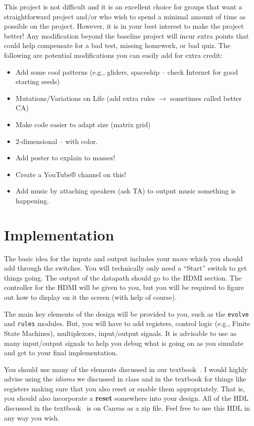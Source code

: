 \documentclass{article}
\begin{document}
This project is not difficult and it is an excellent choice for groups that want a straightforward
project and/or who wish to spend a minimal amount of time as possible on the project. However,
it is in your best interest to make the project better! Any modification beyond the baseline
project will incur extra points that could help compensate for a bad test, missing homework, or
bad quiz. The following are potential modifications you can easily add
for extra credit:
\begin{itemize}
\item Add some cool patterns (e.g., gliders, spaceship – check Internet for good starting seeds)
\item Mutations/Variations on Life (add extra rules $\rightarrow$ sometimes called better CA)
\item Make code easier to adapt size (matrix grid)
\item $2$-dimensional – with color.
\item Add poster to explain to masses!
\item Create a YouTube® channel on this!
\item Add music by attaching speakers (ask TA) to output music something is
  happening.
\end{itemize}

\section{Implementation}

The basic idea for the inputs and output includes your move which you
should add through the switches.  You will technically only need a
``Start'' switch to get things going.  The output of the datapath
should go to the HDMI section.  The controller for the HDMI will be
given to you, but you will be required to figure out how to display on
it the screen (with help of course).

The main key elements of the design will be provided to you, such as
the \verb!evolve! and \verb!rules!
modules.  But, you will have to add registers,
control logic (e.g., Finite State Machines), multiplexors, input/output signals.
It is advisable to use as many input/output signals to help you debug
what is going on as you simulate and get to your final
implementation.

You should use many of the elements discussed in our
textbook~\cite{ddca-riscv}.  I would highly advise using the
\textit{idioms} we discussed in class 
and in the textbook for things
like registers making sure that you also reset or enable them appropriately.
That is, you should also incorporate a \textbf{reset} somewhere into your
design.  All of the HDL discussed in the textbook~\cite{ddca-riscv} is
on Canvas as a zip file.  Feel free to use this HDL in any way you wish.
\end{document}
